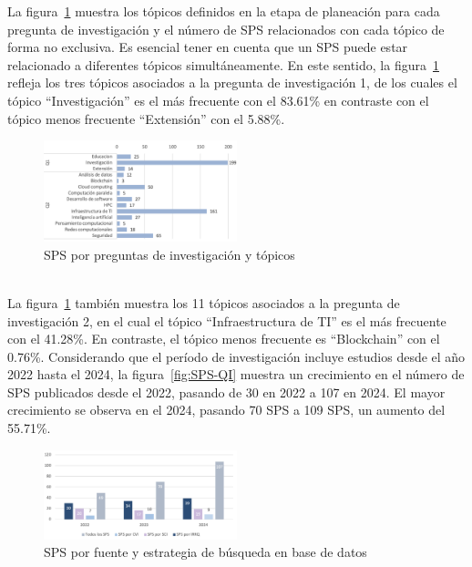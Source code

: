 La figura~\ref{fig:SPS-topics} muestra los tópicos definidos en la etapa de planeación para cada pregunta de investigación y el número de SPS relacionados con cada tópico de forma no exclusiva. Es esencial tener en cuenta que un SPS puede estar relacionado a diferentes tópicos simultáneamente. En este sentido, la figura~\ref{fig:SPS-topics} refleja los tres tópicos asociados a la pregunta de investigación 1, de los cuales el tópico ``Investigación'' es el más frecuente con el 83.61\% en contraste con el tópico menos frecuente ``Extensión'' con el 5.88\%.
\begin{figure}[htbp]
    \centering
    \includegraphics[width=0.5\textwidth]{resources/images/resultados/SPS-topics.png}
    \caption{SPS por preguntas de investigación y tópicos}\label{fig:SPS-topics}
\end{figure}
\mbox{}\\
La figura~\ref{fig:SPS-topics} también muestra los 11 tópicos asociados a la pregunta de investigación 2, en el cual el tópico ``Infraestructura de TI'' es el más frecuente con el  41.28\%. En contraste, el tópico menos frecuente es ``Blockchain'' con el 0.76\%. Considerando que el período de investigación incluye estudios desde el año 2022 hasta el 2024, la figura~\ref{fig:SPS-QI} muestra un crecimiento en el número de SPS publicados desde el 2022, pasando de 30 en 2022 a 107 en 2024. El mayor crecimiento se observa en el 2024, pasando 70 SPS a 109 SPS, un aumento del 55.71\%.\\
\begin{figure}[htbp]
    \centering
    \includegraphics[width=0.5\textwidth]{resources/images/resultados/SPS-by-se.png}
    \caption{SPS por fuente y estrategia de búsqueda en base de datos}\label{fig:SPS-BY-SE}
\end{figure}
